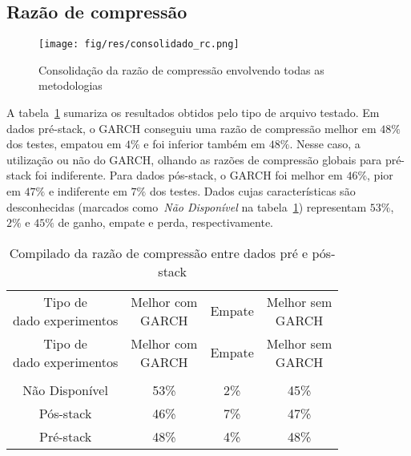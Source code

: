\subsection{Razão de compressão}

\begin{figure}[hbtp]
\centering
\texttt{[image: fig/res/consolidado\_rc.png]}
\caption[Razão de compressão consolidada]{Consolidação da razão de compressão envolvendo todas as metodologias}
\label{Figura:ConsolidadoRC}
\end{figure}
 

 A tabela~\ref{Tabela:RazaoCompressaoPrePosStack} sumariza os resultados obtidos pelo tipo de arquivo testado. Em dados pré-stack, o GARCH conseguiu uma razão de
 compressão melhor em $48\%$ dos testes, empatou em $4\%$ e foi inferior também em $48\%$. Nesse caso, a utilização ou não do GARCH, olhando as razões de compressão globais para pré-stack foi indiferente. Para dados pós-stack, o GARCH foi melhor em $46\%$, pior em $47\%$ e indiferente em $7\%$ dos testes. Dados cujas características são desconhecidas (marcados como~\emph{Não Disponível} na tabela~\ref{Tabela:RazaoCompressaoPrePosStack}) representam $53\%$, $2\%$ e $45\%$ de ganho, empate e perda, respectivamente.
 
\begin{center}
\begin{longtable}{cccc}
\toprule
\rowcolor{white}
\caption{Compilado da razão de compressão entre dados pré e pós-stack}
\label{Tabela:RazaoCompressaoPrePosStack} \\
\midrule
\rowcolor{white}
   \specialcell{Tipo de\\dado experimentos} & \specialcell{Melhor com\\GARCH} &
   Empate & \specialcell{Melhor sem\\GARCH} \\
\midrule
\endfirsthead
\midrule
\rowcolor{white}
   \specialcell{Tipo de\\dado experimentos} & \specialcell{Melhor com\\GARCH} &
   Empate & \specialcell{Melhor sem\\GARCH} \\
\toprule
\endhead
\midrule \\ %
\endfoot
\bottomrule
\endlastfoot
    Não Disponível & 53\%  & 2\%   & 45\% \\
    Pós-stack & 46\%  & 7\%   & 47\% \\
    Pré-stack & 48\%  & 4\%   & 48\% \\
\end{longtable}
\end{center}

